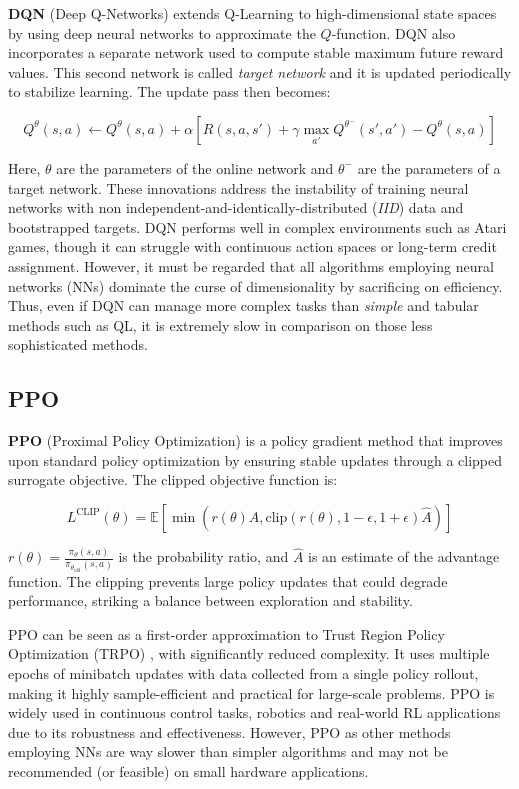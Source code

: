 \textbf{DQN} (Deep Q-Networks) \cite{osband2016deep} extends Q-Learning to high-dimensional state spaces by using deep neural networks to approximate the $Q$-function.
DQN also incorporates a separate network used to compute stable maximum future reward values. This second network is called \textit{target network} and it is updated periodically to stabilize learning.
The update pass then becomes:

\[
  Q^{\theta}(s, a) \leftarrow Q^{\theta}(s, a) + \alpha \left[ R(s, a, s') + \gamma \max_{a'} Q^{\theta ^ -}(s', a') - Q^{\theta}(s, a) \right]
\]

Here, $\theta$ are the parameters of the online network and $\theta^{-}$ are the parameters of a target network.
These innovations address the instability of training neural networks with non independent-and-identically-distributed (\textit{IID}) data and bootstrapped targets.
DQN performs well in complex environments such as Atari games, though it can struggle with continuous action spaces or long-term credit assignment.
However, it must be regarded that all algorithms employing neural networks (NNs) dominate the curse of dimensionality by sacrificing on efficiency. Thus, even if DQN can manage more complex tasks than \textit{simple} and tabular methods such as QL, it is extremely slow in comparison on those less sophisticated methods. 

\subsection{PPO}

\textbf{PPO} (Proximal Policy Optimization) \cite{pmlr-v115-wang20b} is a policy gradient method that improves upon standard policy optimization by ensuring stable updates through a clipped surrogate objective. The clipped objective function is:

\[
L^{\text{CLIP}}(\theta) = \mathbb{E} \left[ \min \left( r(\theta) \hat{A}, \text{clip}(r(\theta), 1 - \epsilon, 1 + \epsilon) \hat{A} \right) \right]
\]

$r(\theta) = \frac{\pi_\theta(s, a)}{\pi_{\theta_{\text{old}}}(s, a)}$ is the probability ratio, and $\hat{A}$ is an estimate of the advantage function. The clipping prevents large policy updates that could degrade performance, striking a balance between exploration and stability.

PPO can be seen as a first-order approximation to Trust Region Policy Optimization (TRPO) \cite{schulman2015trust}, with significantly reduced complexity. It uses multiple epochs of minibatch updates with data collected from a single policy rollout, making it highly sample-efficient and practical for large-scale problems.
PPO is widely used in continuous control tasks, robotics and real-world RL applications due to its robustness and effectiveness.
However, PPO as other methods employing NNs are way slower than simpler algorithms and may not be recommended (or feasible) on small hardware applications.

